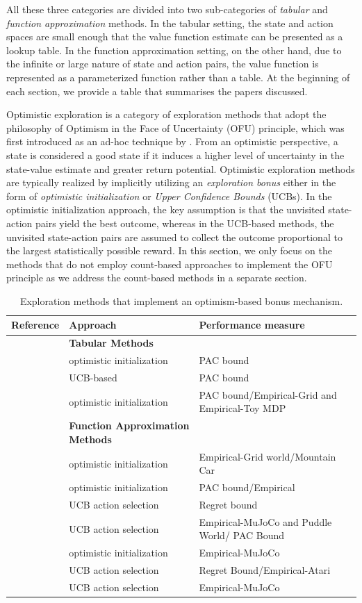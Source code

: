 All these three categories are divided into two sub-categories of \textit{tabular} and \textit{function approximation} methods. In the tabular setting, the state and action spaces are small enough that the value function estimate can be presented as a lookup table. In the function approximation setting, on the other hand, due to the infinite or large nature of state and action pairs, the value function is represented as a parameterized function rather than a table. At the beginning of each section, we provide a table that summarises the papers discussed.

Optimistic exploration is a category of exploration methods that adopt the philosophy of Optimism in the Face of Uncertainty (OFU) principle, which was first introduced as an ad-hoc technique by . From an optimistic perspective, a state is considered a good state if it induces a higher level of uncertainty in the state-value estimate and greater return potential. Optimistic exploration methods are typically realized by implicitly utilizing an \textit{exploration bonus} either in the form of \textit{optimistic initialization}  or \textit{Upper Confidence Bounds} (UCBs). In the optimistic initialization approach, the key assumption is that the unvisited state-action pairs yield the best outcome, whereas in the UCB-based methods, the unvisited state-action pairs are assumed to collect the outcome proportional to the largest statistically possible reward. In this section, we only focus on the methods that do not employ count-based approaches to implement the OFU principle as we address the count-based methods in a separate section.
\begin{table} 
\centering
\begin{tabular}{p{6cm}|p{4.5cm}|p{4.5cm}}
    Reference & Approach & Performance measure \\
    \hline
    &\textbf{Tabular Methods}& \\
    \hline
     & optimistic initialization & PAC bound \\
     & UCB-based & PAC bound\\
     & optimistic initialization & PAC bound/Empirical-Grid and Empirical-Toy MDP\\
    \hline
    &\textbf{Function Approximation Methods}& \\
    \hline
     & optimistic initialization & Empirical-Grid world/Mountain Car\\
     & optimistic initialization & PAC bound/Empirical \\
     & UCB action selection & Regret bound \\
     & UCB action selection & Empirical-MuJoCo and Puddle World/ PAC Bound\\
     & optimistic initialization & Empirical-MuJoCo\\
     & UCB action selection &  Regret Bound/Empirical-Atari\\
     & UCB action selection & Empirical-MuJoCo
\end{tabular}
\caption{Exploration methods that implement an optimism-based bonus mechanism.}
\label{tab:optimism-based}
\end{table}

